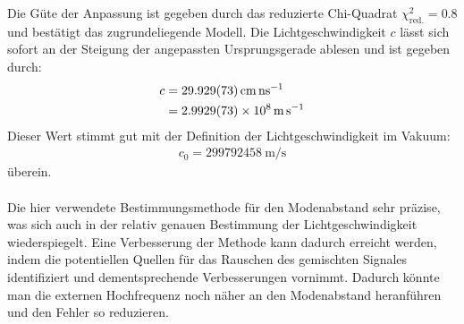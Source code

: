 \documentclass[11pt, a4paper]{article}
\numberwithin{equation}{section}
\begin{document}
Die Güte der Anpassung ist gegeben durch das reduzierte Chi-Quadrat $\chi_\mathrm{red.}^2 = \num{0.8}$ und bestätigt das zugrundeliegende Modell.
Die Lichtgeschwindigkeit $c$ lässt sich sofort an der Steigung der angepassten Ursprungsgerade ablesen und ist gegeben durch:
\begin{align}
	c &= \SI{29.929 +- 0.073}{\centi\metre\per\nano\second} \nonumber\\
	&= \SI{2.9929 +- 0.0073 e8}{\metre\per\second}
\end{align}
Dieser Wert stimmt gut mit der Definition der Lichtgeschwindigkeit im Vakuum:
\begin{align}
	c_0 = \SI{299792458}{\metre\per\second}
\end{align}
überein.\\
\\
Die hier verwendete Bestimmungsmethode für den Modenabstand sehr präzise, was sich auch in der relativ genauen Bestimmung der Lichtgeschwindigkeit wiederspiegelt.
Eine Verbesserung der Methode kann dadurch erreicht werden, indem die potentiellen Quellen für das Rauschen des gemischten Signales identifiziert und dementsprechende Verbesserungen vornimmt.
Dadurch könnte man die externen Hochfrequenz noch näher an den Modenabstand heranführen und den Fehler so reduzieren.
\end{document}
